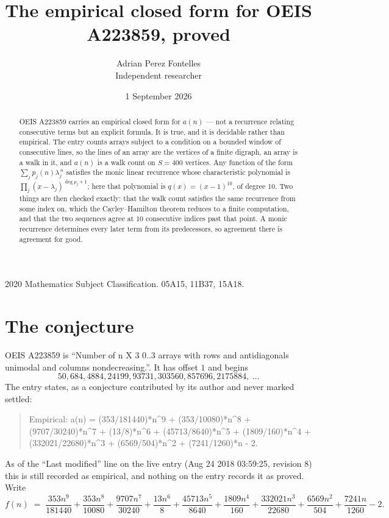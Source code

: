 \documentclass[11pt,a4paper]{article}
\title{The empirical closed form for OEIS A223859, proved}
\author{Adrian Perez Fontelles\\ \small Independent researcher}
\date{1 September 2026}
\theoremstyle{plain}
\theoremstyle{definition}
\begin{document}
\maketitle

\begin{abstract}
OEIS A223859 carries an empirical closed form for $a(n)$ --- not a recurrence relating
consecutive terms but an explicit formula. It is true, and it is decidable rather than
empirical. The entry counts arrays subject to a condition on a bounded window of consecutive lines, so the lines of an array are the
vertices of a finite digraph, an array is a walk in it, and $a(n)$ is a walk count on
$S=400$ vertices. Any function of the form $\sum_j p_j(n)\lambda_j^{\,n}$ satisfies the
monic linear recurrence whose characteristic polynomial is
$\prod_j(x-\lambda_j)^{\deg p_j+1}$; here that polynomial is $q(x)=(x-1)^{10}$, of degree
$10$. Two things are then checked exactly: that the walk count satisfies the same
recurrence from some index on, which the Cayley--Hamilton theorem reduces to a finite
computation, and that the two sequences agree at $10$ consecutive indices past that
point. A monic recurrence determines every later term from its predecessors, so agreement
there is agreement for good.
\end{abstract}

\noindent\small 2020 Mathematics Subject Classification. 05A15, 11B37, 15A18.\normalsize

\section{The conjecture}

OEIS A223859 is ``Number of n X 3 0..3 arrays with rows and antidiagonals unimodal and columns nondecreasing.''. It has offset $1$ and begins
\[
50, 684, 4884, 24199, 93731, 303560, 857696, 2175884,\ \dots
\]
The entry states, as a conjecture contributed by its author and never marked settled:
\begin{quote}
Empirical: a(n) = (353/181440)*n\^{}9 + (353/10080)*n\^{}8 + (9707/30240)*n\^{}7 + (13/8)*n\^{}6 + (45713/8640)*n\^{}5 + (1809/160)*n\^{}4 + (332021/22680)*n\^{}3 + (6569/504)*n\^{}2 + (7241/1260)*n - 2.
\end{quote}
As of the ``Last modified'' line on the live entry (Aug 24 2018 03:59:25, revision 8) this is still
recorded as empirical, and nothing on the entry records it as proved. Write
\[
f(n)\;=\;\frac{353 n^{9}}{181440} + \frac{353 n^{8}}{10080} + \frac{9707 n^{7}}{30240} + \frac{13 n^{6}}{8} + \frac{45713 n^{5}}{8640} + \frac{1809 n^{4}}{160} + \frac{332021 n^{3}}{22680} + \frac{6569 n^{2}}{504} + \frac{7241 n}{1260} - 2.
\]
\end{document}

